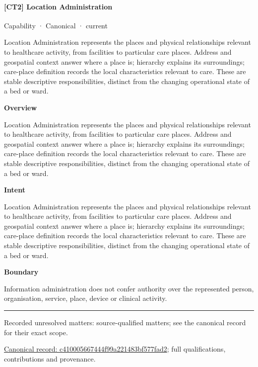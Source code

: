 \paragraph{[CT2] Location Administration}

\label{element:c410005667444f99a221483bf577fad2}
{\small Capability · Canonical · current}\par

Location Administration represents the places and physical relationships relevant to healthcare activity, from facilities to particular care places. Address and geospatial context answer where a place is; hierarchy explains its surroundings; care-place definition records the local characteristics relevant to care. These are stable descriptive responsibilities, distinct from the changing operational state of a bed or ward.



\textbf{Overview}



Location Administration represents the places and physical relationships relevant to healthcare activity, from facilities to particular care places. Address and geospatial context answer where a place is; hierarchy explains its surroundings; care-place definition records the local characteristics relevant to care. These are stable descriptive responsibilities, distinct from the changing operational state of a bed or ward.



\textbf{Intent}



Location Administration represents the places and physical relationships relevant to healthcare activity, from facilities to particular care places. Address and geospatial context answer where a place is; hierarchy explains its surroundings; care-place definition records the local characteristics relevant to care. These are stable descriptive responsibilities, distinct from the changing operational state of a bed or ward.



\textbf{Boundary}



Information administration does not confer authority over the represented person, organisation, service, place, device or clinical activity.



\medskip\hrule\medskip

{\small Recorded unresolved matters: source-qualified matters; see the canonical record for their exact scope.}\par
{\footnotesize \href{../../../../continuum/strategy/capability/c410005667444f99a221483bf577fad2.md}{Canonical record: c410005667444f99a221483bf577fad2}; full qualifications, contributions and provenance.}\par
